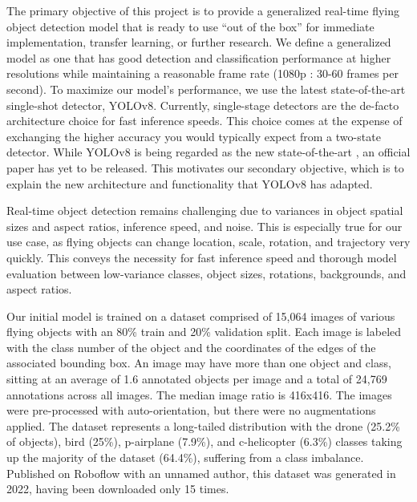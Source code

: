 \documentclass[10pt,twocolumn,letterpaper]{article}
\begin{document}
The primary objective of this project is to provide a generalized real-time flying object detection model that is ready to use ``out of the box'' for immediate implementation, transfer learning, or further research. We define a generalized model as one that has good detection and classification performance at higher resolutions while maintaining a reasonable frame rate (1080p : 30-60 frames per second). To maximize our model's performance, we use the latest state-of-the-art single-shot detector, YOLOv8. Currently, single-stage detectors are the de-facto architecture choice for fast inference speeds. This choice comes at the expense of exchanging the higher accuracy you would typically expect from a two-state detector. While YOLOv8 is being regarded as the new state-of-the-art \cite{state-of-the-art}, an official paper has yet to be released. This motivates our secondary objective, which is to explain the new architecture and functionality that YOLOv8 has adapted. 

Real-time object detection remains challenging due to variances in object spatial sizes and aspect ratios, inference speed, and noise. This is especially true for our use case, as flying objects can change location, scale, rotation, and trajectory very quickly. This conveys the necessity for fast inference speed and thorough model evaluation between low-variance classes, object sizes, rotations, backgrounds, and aspect ratios.

Our initial model is trained on a dataset \cite{InitialDataset} comprised of 15,064 images of various flying objects with an 80\% train and 20\% validation split. Each image is labeled with the class number of the object and the coordinates of the edges of the associated bounding box. An image may have more than one object and class, sitting at an average of 1.6 annotated objects per image and a total of 24,769 annotations across all images. The median image ratio is 416x416. The images were pre-processed with auto-orientation, but there were no augmentations applied. The dataset represents a long-tailed distribution with the drone (25.2\% of objects), bird (25\%), p-airplane (7.9\%), and c-helicopter (6.3\%) classes taking up the majority of the dataset (64.4\%), suffering from a class imbalance. Published on Roboflow with an unnamed author, this dataset was generated in 2022, having been downloaded only 15 times.
\end{document}
